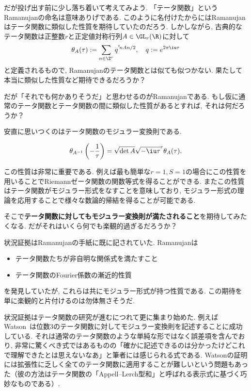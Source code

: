 \documentclass[11pt,b5paper,oneside,lualatex]{ltjsarticle} %
\numberwithin{equation}{section} %
\begin{document}
だが投げ出す前に少し落ち着いて考えてみよう. 
「テータ関数」というRamanujanの命名は意味ありげである. 
このように名付けたからにはRamanujanはテータ関数に類似した性質を期待していたのだろう. 
しかしながら, 古典的なテータ関数は正整数$ r $と正定値対称行列$ A \in \GL_r(\R) $に対して
\[
\theta_A (\tau) :=
\sum_{n \in \Z^r} q^{{}^t\!n A n/2}, \quad
q := e^{2\pi\iu\tau}
\]
と定義されるもので, Ramanujanのテータ関数とは似ても似つかない. 
果たして本当に類似した性質など期待できるだろうか？

だが「それでも何かありそうだ」と思わせるのがRamanujanである. 
もし仮に通常のテータ関数とテータ関数の間に類似した性質があるとすれば, それは何だろうか？

安直に思いつくのはテータ関数のモジュラー変換則である. 

\begin{prop}
	\label{prop:theta_modular_trans}
	\[
	\theta_{A^{-1}} \left( -\frac{1}{\tau} \right) =
	\sqrt{\det A} \sqrt{-\iu \tau}^r \theta_A (\tau).
	\]
\end{prop}

この性質は非常に重要である. 
例えば最も簡単な$ r = 1, S = 1 $の場合にこの性質を用いることでRiemannゼータ関数の関数等式を得ることができる. 
またこの性質はテータ関数がモジュラー形式をなすことを意味しており, モジュラー形式の理論を応用することで様々な数論的帰結を得ることが可能である. 

そこで\textbf{テータ関数に対してもモジュラー変換則が満たされること}を期待してみたくなる. 
だがそれはいくら何でも楽観的過ぎるだろうか？

状況証拠はRamanujanの手紙に既に記されていた. 
Ramanujanは
\begin{itemize}
	\item {}テータ関数たちが非自明な関係式を満たすこと
	\item {}テータ関数のFourier係数の漸近的性質
\end{itemize}
を発見していたが, これらは共にモジュラー形式が持つ性質である. 
この期待を単に楽観的と片付けるのは勿体無さそうだ. 

状況証拠はテータ関数の研究が進むにつれて更に集まり始めた. 
例えばWatson~\cite[pp. 78]{Watson}は位数$ 3 $のテータ関数に対してモジュラー変換則を記述することに成功している. 
それは通常のテータ関数のような単純な形ではなく誤差項を含んでおり, 非常に驚くべき式ではあるものの「確かに記述できるのは分かったけどこれで理解できたとは思えないなあ」と筆者には感じられる式である. 
Watsonの証明には拡張性に乏しく全てのテータ関数に適用することが難しいという問題もあった（彼の方法はテータ関数の「Appell--Lerch型和」と呼ばれる表示式に基づく巧妙なものである）. 
\end{document}
